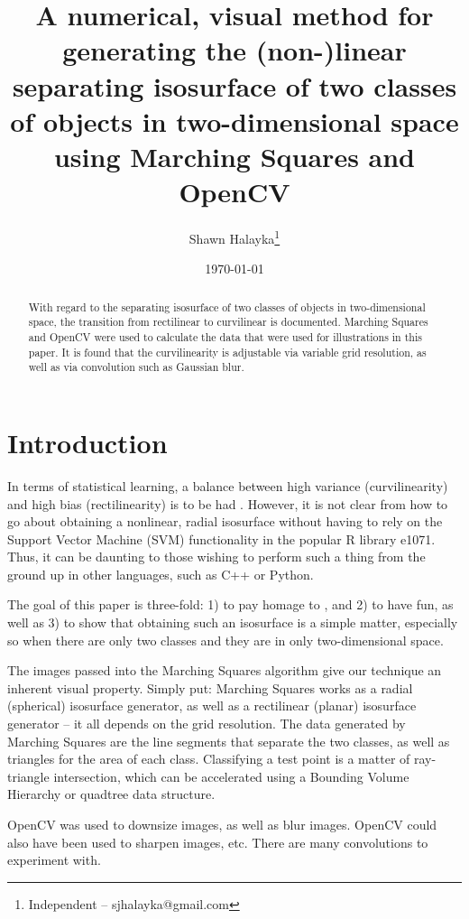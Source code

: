 \documentclass[12pt]{article}
\title{A numerical, visual method for generating the (non-)linear separating isosurface of two classes of objects in two-dimensional space using Marching Squares and OpenCV}
\author{
Shawn Halayka\footnote{Independent -- sjhalayka@gmail.com}
}
\date{\today\;\currenttime}
\begin{document}
\maketitle

\begin{abstract}
With regard to the separating isosurface of two classes of objects in two-dimensional space, the transition from rectilinear to curvilinear is documented.
Marching Squares and OpenCV were used to calculate the data that were used for illustrations in this paper.
It is found that the curvilinearity is adjustable via variable grid resolution, as well as via convolution such as Gaussian blur.
\end{abstract}




\section{Introduction}

In terms of statistical learning, a balance between high variance (curvilinearity) and high bias (rectilinearity) is to be had \cite{james}.
However, it is not clear from \cite{james} how to go about obtaining a nonlinear, radial isosurface without having to rely on the Support Vector Machine (SVM) functionality in the popular R library e1071.
Thus, it can be daunting to those wishing to perform such a thing from the ground up in other languages, such as C++ or Python.

The goal of this paper is three-fold: 1) to pay homage to \cite{james}, and 2) to have fun, as well as 3) to show that obtaining such an isosurface is a simple matter, especially so when there are only two classes and they are in only two-dimensional space.

The images passed into the Marching Squares algorithm give our technique an inherent visual property.
Simply put: Marching Squares \cite{halayka, gong, bobrowski} works as a radial (spherical) isosurface generator, as well as a rectilinear (planar) isosurface generator -- it all depends on the grid resolution.
The data generated by Marching Squares are the line segments that separate the two classes, as well as triangles for the area of each class.
Classifying a test point is a matter of ray-triangle intersection, which can be accelerated using a Bounding Volume Hierarchy or quadtree data structure.

OpenCV \cite{opencv} was used to downsize images, as well as blur images.
OpenCV could also have been used to sharpen images, etc.
There are many convolutions to experiment with.
\end{document}
